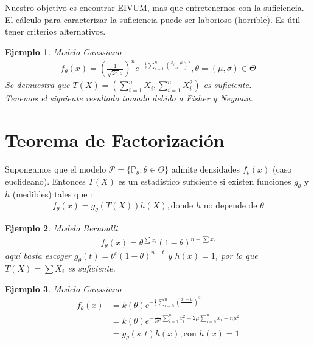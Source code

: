 \documentclass[10pt]{article}
\theoremstyle{plain}
\newtheorem{ej}{Ejemplo}
\theoremstyle{definition}
\begin{document}
Nuestro objetivo es encontrar EIVUM, mas que entretenernos con la suficiencia. El cálculo para caracterizar la suficiencia puede ser laborioso (horrible). Es útil tener criterios alternativos.\\

\begin{ej} Modelo Gaussiano\\
\begin{align*}
f_{\theta}(x) = \left(\frac{1}{\sqrt{2\pi}\sigma}\right)^ne^{-\frac{1}{2}\sum_{i=1}^n{\left(\frac{x_{i}-\mu}{\sigma}\right)^2}}, \theta = (\mu, \sigma) \in \Theta
\end{align*}
Se demuestra que $T(X) = \left(\sum_{i=1}^n{X_{i}}, \sum_{i=1}^n{X_{i}^2}\right)$ es suficiente.\\

Tenemos el siguiente resultado tomado debido a Fisher y Neyman.
\end{ej}

\section{Teorema de Factorización}
 Supongamos que el modelo $\mathcal{P} = \{\mathbb{P}_{\theta}\colon \theta \in \Theta\}$ admite densidades $f_{\theta}(x)$ (caso euclideano). Entonces $T(X)$ es un estadístico suficiente si existen funciones $g_{\theta}$ y $h$ (medibles) tales que :
\begin{align*}
f_{\theta}(x) = g_{\theta}(T(X))h(X), \text{donde $h$ no depende de $\theta$}
\end{align*}

\begin{ej} Modelo Bernoulli\\
\begin{align*}
f_{\theta}(x) = \theta^{\sum{x_{i}}}(1-\theta)^{n-\sum{x_{i}}}
\end{align*}
aquí basta escoger $g_{\theta}(t) = \theta^{t}(1-\theta)^{n-t}$ y $h(x)=1$, por lo que $T(X) = \sum{X_{i}}$ es suficiente.
\end{ej}


\begin{ej} Modelo Gaussiano\\
\begin{align*}
f_{\theta}(x) &= k(\theta)e^{-\frac{1}{2}\sum_{i=0}^n{\left(\frac{x_{i}-\mu}{\sigma}\right)^2}}\\
&= k(\theta)e^{-\frac{1}{2\sigma^2}\sum_{i=0}^n{x_{i}^2}-2\mu\sum_{i=0}^n{x_{i}}+ n \mu^2}\\
&= g_{\theta}(s,t) h(x), \text{con $h(x) = 1$}
\end{align*}
\end{ej}
\end{document}
